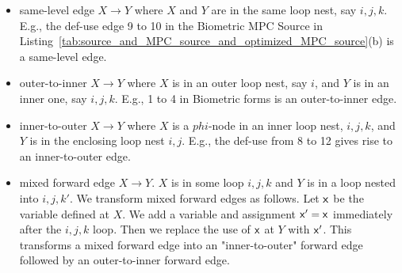 \begin{itemize}
\item same-level edge $X\rightarrow Y$ where $X$ and $Y$ are in the same loop nest, say $i,j,k$. E.g., the def-use edge 9 to 10 in the Biometric MPC Source in Listing~\ref{tab:source_and_MPC_source_and_optimized_MPC_source}(b) is a same-level edge. 
\item outer-to-inner $X\rightarrow Y$ where $X$ is in an outer loop nest, say $i$, and $Y$ is in an inner one, say $i,j,k$. E.g., 1 to 4 in Biometric forms is an outer-to-inner edge.
\item inner-to-outer $X\rightarrow Y$ where $X$ is a $phi$-node in an inner loop nest, $i,j,k$, and $Y$ is in the enclosing loop nest $i,j$. E.g., the def-use from 8 to 12 gives rise to an inner-to-outer edge.


\item mixed forward edge $X\rightarrow Y$. $X$ is in some loop $i,j,k$ and $Y$ is in a loop nested into $i,j,k'$. We transform mixed forward edges as follows. Let ${\sf {x}}$ be the variable defined at $X$. We add a variable and assignment ${\sf {x}}' = {\sf {x}}$ immediately after the $i,j,k$ loop. Then we replace the use of ${\sf {x}}$ at $Y$ with ${\sf {x}}'$. This transforms a mixed forward edge into an "inner-to-outer" forward edge followed by an outer-to-inner forward edge. %
 \end{itemize}

